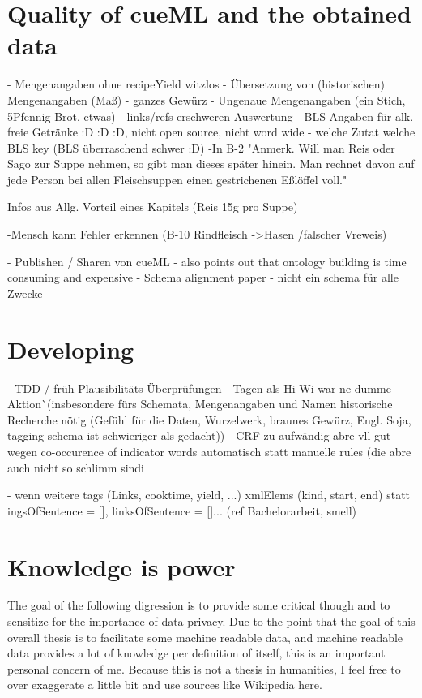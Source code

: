 \documentclass[12pt, twoside]{report}
\begin{document}
\section{Quality of cueML and the obtained data}
- Mengenangaben ohne recipeYield witzlos
- Übersetzung von (historischen) Mengenangaben (Maß)
- ganzes Gewürz
- Ungenaue Mengenangaben (ein Stich, 5Pfennig Brot, etwas)
- links/refs erschweren Auswertung
- BLS Angaben für alk. freie Getränke :D :D :D, nicht open source, nicht word wide
- welche Zutat welche BLS key (BLS überraschend schwer :D)
-In B-2 "Anmerk. Will man Reis oder Sago zur Suppe nehmen, so gibt man dieses später
hinein. Man rechnet davon auf jede Person bei allen Fleischsuppen einen gestrichenen Eßlöffel voll."

Infos aus Allg. Vorteil eines Kapitels (Reis 15g pro Suppe)

-Mensch kann Fehler erkennen (B-10 Rindfleisch ->Hasen /falscher Vreweis)

- Publishen / Sharen von cueML
	- \parencite{GrammaBased} also points out that ontology building is time consuming and expensive
	- Schema alignment paper - nicht ein schema für alle Zwecke

\section{Developing}
- TDD / früh Plausibilitäts-Überprüfungen - Tagen als Hi-Wi war ne dumme Aktion^^ (insbesondere fürs Schemata, Mengenangaben und Namen historische Recherche nötig (Gefühl für die Daten, Wurzelwerk, braunes Gewürz,	Engl. Soja, tagging schema ist schwieriger als gedacht))
- CRF zu aufwändig abre vll gut wegen co-occurence of indicator words automatisch statt manuelle rules (die abre auch nicht so schlimm sind^^)

- wenn weitere tags (Links, cooktime, yield, ...) xmlElems (kind, start, end) statt ingsOfSentence = [], linksOfSentence = []... (ref Bachelorarbeit, smell)

\section{Knowledge is power}
The goal of the following digression is to provide some critical though and to sensitize for the importance of data privacy. Due to the point that the goal of this overall thesis is to facilitate some machine readable data, and machine readable data provides a lot of knowledge per definition of itself, this is an important personal concern of me. Because this is not a thesis in humanities, I feel free to over exaggerate a little bit and use sources like Wikipedia here.
\end{document}

